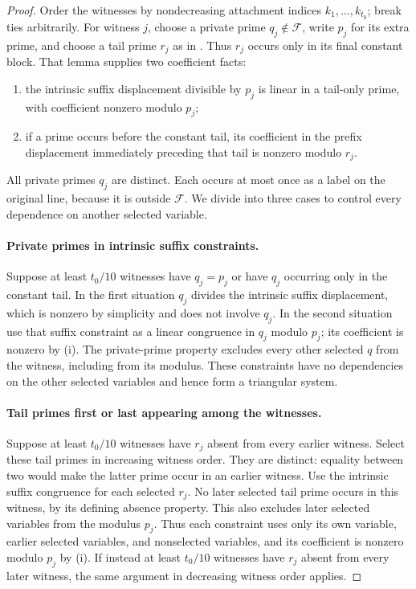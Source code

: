 \begin{proof}
Order the witnesses by nondecreasing attachment indices
$k_1,\ldots,k_{t_0}$; break ties arbitrarily.  For witness $j$, choose a
private prime $q_j\notin\mathcal F$, write $p_j$ for its extra prime,
and choose a tail prime $r_j$ as in
.  Thus $r_j$ occurs only in its final
constant block.  That lemma supplies two coefficient facts:
\begin{enumerate}[label=(\roman*)]
\item the intrinsic suffix displacement divisible by $p_j$ is linear
in a tail-only prime, with coefficient nonzero modulo $p_j$;
\item if a prime occurs before the constant tail, its coefficient in
the prefix displacement immediately preceding that tail is nonzero
modulo $r_j$.
\end{enumerate}
All private primes $q_j$ are distinct.  Each occurs at most once as a
label on the original line, because it is outside $\mathcal F$.
We divide into three cases to control every dependence on another
selected variable.

\paragraph{Private primes in intrinsic suffix constraints.}
Suppose at least $t_0/10$ witnesses have $q_j=p_j$ or have $q_j$
occurring only in the constant tail.  In the first situation $q_j$
divides the intrinsic suffix displacement, which is nonzero by
simplicity and does not involve $q_j$.  In the second situation use
that suffix constraint as a linear congruence in $q_j$ modulo $p_j$;
its coefficient is nonzero by (i).  The private-prime property excludes
every other selected $q$ from the witness, including from its modulus.
These constraints have no dependencies on the other selected
variables and hence form a triangular system.

\paragraph{Tail primes first or last appearing among the witnesses.}
Suppose at least $t_0/10$ witnesses have $r_j$ absent from every earlier
witness.  Select these tail primes in increasing witness order.  They
are distinct: equality between two would make the latter prime occur
in an earlier witness.  Use the intrinsic suffix congruence for each
selected $r_j$.  No later selected tail prime occurs in this witness,
by its defining absence property.  This also excludes later selected
variables from the modulus $p_j$.  Thus each constraint uses only its
own variable, earlier selected variables, and nonselected variables,
and its coefficient is nonzero modulo $p_j$ by (i).
If instead at least $t_0/10$ witnesses have $r_j$ absent from every later
witness, the same argument in decreasing witness order applies.


\end{proof}
